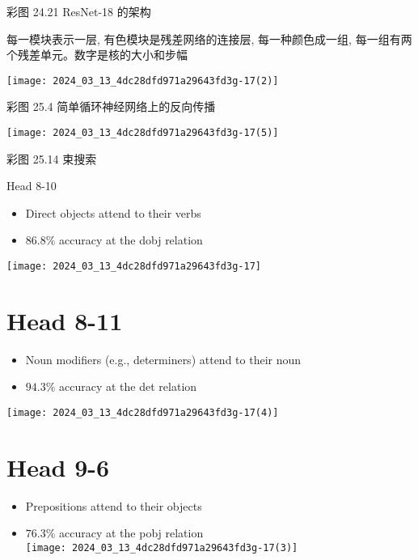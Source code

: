 \documentclass[10pt]{article}
\begin{document}
彩图 24.21 ResNet-18 的架构

每一模块表示一层, 有色模块是残差网络的连接层, 每一种颜色成一组, 每一组有两个残差单元。数字是核的大小和步幅

\begin{center}
\texttt{[image: 2024\_03\_13\_4dc28dfd971a29643fd3g-17(2)]}
\end{center}

彩图 25.4 简单循环神经网络上的反向传播

\begin{center}
\texttt{[image: 2024\_03\_13\_4dc28dfd971a29643fd3g-17(5)]}
\end{center}

彩图 25.14 束搜索

Head 8-10

\begin{itemize}
  \item Direct objects attend to their verbs
  \item $86.8 \%$ accuracy at the dobj relation
\end{itemize}

\begin{center}
\texttt{[image: 2024\_03\_13\_4dc28dfd971a29643fd3g-17]}
\end{center}

\section*{Head 8-11}
\begin{itemize}
  \item Noun modifiers (e.g., determiners) attend to their noun
  \item $94.3 \%$ accuracy at the det relation
\end{itemize}

\begin{center}
\texttt{[image: 2024\_03\_13\_4dc28dfd971a29643fd3g-17(4)]}
\end{center}

\section*{Head 9-6}
\begin{itemize}
  \item Prepositions attend to their objects
  \item $76.3 \%$ accuracy at the pobj relation\\
\texttt{[image: 2024\_03\_13\_4dc28dfd971a29643fd3g-17(3)]}
\end{itemize}
\end{document}
